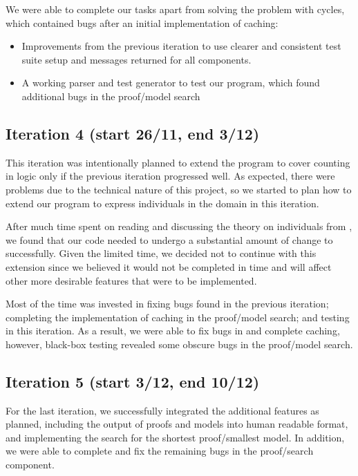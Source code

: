 We were able to complete our tasks apart from solving the problem with cycles, which contained bugs after an initial implementation of caching:
\begin{itemize}
\item Improvements from the previous iteration to use clearer and consistent test suite setup and messages returned for all components.
\item A working parser and test generator to test our program, which found additional bugs in the proof/model search
\end{itemize}

\subsection*{Iteration 4 (start 26/11, end 3/12)}

This iteration was intentionally planned to extend the program to cover counting in logic only if the previous iteration progressed well. As expected, there were problems due to the technical nature of this project, so we started to plan how to extend our program to express individuals in the domain in this iteration.

After much time spent on reading and discussing the theory on individuals from \cite{Schmidt:2007:UTD:1785162.1785195}, we found that our code needed to undergo a substantial amount of change to successfully. Given the limited time, we decided not to continue with this extension since we believed it would not be completed in time and will affect other more desirable features that were to be implemented.

Most of the time was invested in fixing bugs found in the previous iteration; completing the implementation of caching in the proof/model search; and testing in this iteration. As a result, we were able to fix bugs in and complete caching, however, black-box testing revealed some obscure bugs in the proof/model search.

\subsection*{Iteration 5 (start 3/12, end 10/12)}

For the last iteration, we successfully integrated the additional features as planned, including the output of proofs and models into human readable format, and implementing the search for the shortest proof/smallest model. In addition, we were able to complete and fix the remaining bugs in the proof/search component.

